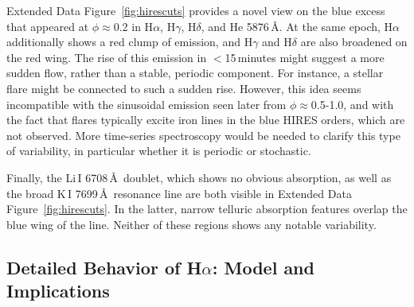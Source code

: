 \documentclass{nature3}
\begin{document}
\begin{methods}
Extended Data Figure~\ref{fig:hirescuts} provides a novel view on the
blue excess that appeared at $\phi$$\approx$0.2 in H$\alpha$, H$\gamma$,
H$\delta$, and He 5876\,\AA.  At the same epoch, H$\alpha$ additionally
shows a red clump of emission, and H$\gamma$ and H$\delta$ are also
broadened on the red wing.  The rise of this emission in $<$15\,minutes
might suggest a more sudden flow, rather than a stable, periodic
component.  For instance, a stellar flare might be connected to such a
sudden rise.  However, this idea seems incompatible with the sinusoidal
emission seen later from $\phi$$\approx$0.5-1.0, and with the fact that
flares typically excite iron lines in the blue HIRES orders, which are
not observed.  More time-series spectroscopy would be needed to clarify
this type of variability, in particular whether it is periodic or
stochastic.

Finally, the Li\,\textsc{I} 6708\,\AA\ doublet, which shows no obvious
absorption, as well as the broad K\,\textsc{I} 7699\,\AA\ resonance
line are both visible in Extended Data Figure~\ref{fig:hirescuts}.  In the latter,
narrow telluric absorption features overlap the blue wing of the line.
Neither of these regions shows any notable variability.



\subsection{Detailed Behavior of H$\alpha$: Model and Implications}\phantom{+}
\label{subsec:halpha}


\end{methods}
\end{document}
